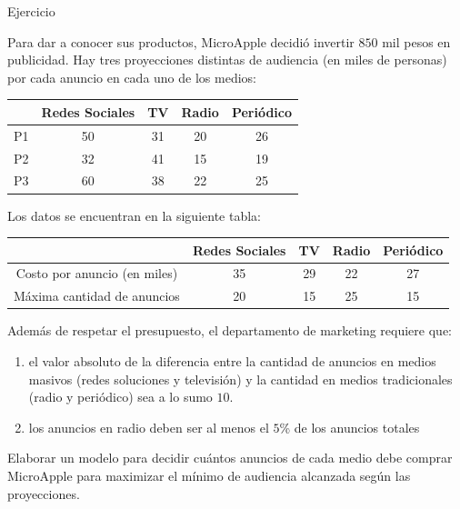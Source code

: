 \documentclass[10pt, aspectratio=169]{beamer}
\begin{document}
\begin{frame}{Ejercicio}
    \scriptsize
    \parbox{\textwidth}{Para dar a conocer sus productos, MicroApple decidió invertir  $850$
        mil pesos en publicidad. Hay tres proyecciones distintas de audiencia (en miles de personas)
        por cada anuncio en cada uno de los medios:
    \begin{table}[]
        \centering
        \begin{tabular}{ccccc}\toprule
             & Redes Sociales & TV & Radio & Periódico \\ \midrule
            P1 & 50  & 31 & 20 & 26 \\
            P2 & 32  & 41 & 15 & 19 \\
            P3 & 60  & 38 & 22 & 25
        \end{tabular}
    \end{table}

        Los datos se encuentran en la siguiente tabla:
        \begin{table}[]
            \centering
            \begin{tabular}{ccccc}
                \toprule
                & Redes Sociales & TV & Radio & Periódico \\ \midrule
                Costo por anuncio (en miles) & 35 & 29    & 22     & 27        \\
                Máxima cantidad de anuncios  & 20 & 15    & 25     & 15
            \end{tabular}
        \end{table}
        Además de respetar el presupuesto, el departamento de marketing requiere que:
        \begin{enumerate}[(1)]
            \item
            el valor absoluto de la diferencia entre la cantidad de anuncios en medios masivos (redes soluciones y
            televisión) y la cantidad en medios tradicionales (radio y periódico) sea a lo sumo $10$.
            \item los anuncios en radio deben ser al menos el $5$\% de los anuncios totales
        \end{enumerate}

        Elaborar un modelo para decidir cuántos anuncios de cada medio debe comprar MicroApple para maximizar el mínimo de
        audiencia alcanzada según las proyecciones.
    }
\end{frame}
\end{document}
